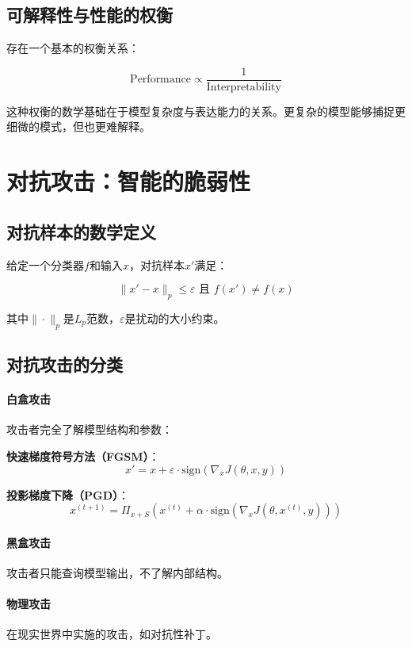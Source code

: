 \subsection{可解释性与性能的权衡}

存在一个基本的权衡关系：

$$\text{Performance} \propto \frac{1}{\text{Interpretability}}$$

这种权衡的数学基础在于模型复杂度与表达能力的关系。更复杂的模型能够捕捉更细微的模式，但也更难解释。

\section{对抗攻击：智能的脆弱性}

\subsection{对抗样本的数学定义}

给定一个分类器$f$和输入$x$，对抗样本$x'$满足：

$$\|x' - x\|_p \leq \varepsilon \text{ 且 } f(x') \neq f(x)$$

其中$\|\cdot\|_p$是$L_p$范数，$\varepsilon$是扰动的大小约束。

\subsection{对抗攻击的分类}

\paragraph{白盒攻击}
攻击者完全了解模型结构和参数：

\textbf{快速梯度符号方法（FGSM）}：
$$x' = x + \varepsilon \cdot \text{sign}(\nabla_x J(\theta, x, y))$$

\textbf{投影梯度下降（PGD）}：
$$x^{(t+1)} = \Pi_{x+S}(x^{(t)} + \alpha \cdot \text{sign}(\nabla_x J(\theta, x^{(t)}, y)))$$

\paragraph{黑盒攻击}
攻击者只能查询模型输出，不了解内部结构。

\paragraph{物理攻击}
在现实世界中实施的攻击，如对抗性补丁。

